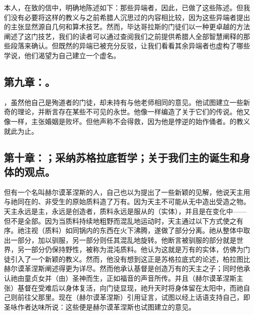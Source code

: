 本人，在致的信中，明确地陈述如下：那些异端者，因此，已做了这些陈述。但我们没有必要将这样的教义与之前希腊人沉思过的内容相比较，因为这些异端者提出的主张显然源自几何和算术技艺。然而，毕达哥拉斯的门徒们以一种更卓越的方法阐述了这门技艺，我们的读者可以通过查阅我们之前提供希腊人全部智慧阐释的那些段落来确认。但既然的异端已被充分反驳，让我们看看其余异端者也虚构了哪些学说，他们渴望为自己建立一个虚名。\par


\subsection{第九章：。}

，虽然他自己是殉道者的门徒，却未持有与他老师相同的意见。他试图建立一些新奇的理论，并断言存在某些不可见的永世。他像一样编造了关于它们的传说。他又像一样，主张婚姻是败坏。但他声称不会得救，因为他是悖逆的始作俑者。的教义就此为止。\par


\subsection{第十章：；采纳苏格拉底哲学；关于我们主的诞生和身体的观点。}

但有一个名叫赫尔谟革涅斯的人，自己也以为提出了一些新颖的见解，他说天主用与祂同在的、非受生的原始质料造了万有。因为天主不可能从无中造出受造之物。天主永远是主，永远是创造者，质料永远是服从的（实体），并且是在变化中——但不是全部。因为当质料持续地粗野而混乱地运动时，天主通过以下方式使之有序。祂注视（质料）如同锅内的东西在火下沸腾，遂做了部分分离。祂从整体中取出一部分，加以驯服，另一部分则任其混乱地旋转。他断言被驯服的部分就是世界，另一部分仍保持野性，被称为混沌质料。他认为这就是万有的实体，仿佛为门徒引入了一个新颖的教义。然而，他没有想到这正是苏格拉底式的论述，柏拉图比赫尔谟革涅斯阐述得更为详尽。然而他承认基督是创造万有的天主之子；同时他承认祂由童贞女并（由）圣神而生，正如福音的声音所传。并且（赫尔谟革涅斯主张）基督在受难后以身体复活，向门徒显现，祂升天时将身体留在太阳中，而祂自己则前往父那里。现在（赫尔谟革涅斯）引用证言，试图以经上话语支持自己，即圣咏作者达味所说：这些便是赫尔谟革涅斯也试图建立的意见。\par

